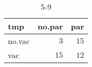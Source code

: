 %
\begin{table}[!tbp]
\caption{5-9\label{5-9}} 
\begin{center}
\begin{tabular}{lrr}
\hline\hline
\multicolumn{1}{l}{tmp}&\multicolumn{1}{c}{no.par}&\multicolumn{1}{c}{par}\tabularnewline
\hline
no.vac&$ 3$&$15$\tabularnewline
vac&$15$&$12$\tabularnewline
\hline
\end{tabular}
\end{center}
\end{table}

